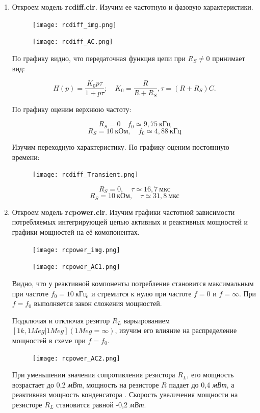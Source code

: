 \documentclass[a4paper, 12pt]{article}%
\begin{document}
\begin{enumerate}
\item Откроем модель \textbf{rcdiff.cir}. Изучим ее частотную и фазовую характеристики.

\begin{figure}[h!]
\centering
\texttt{[image: rcdiff\_img.png]}
\label{fig:Image1}
\end{figure}

\begin{figure}[h!]
\centering
\texttt{[image: rcdiff\_AC.png]}
\label{fig:Image1}
\end{figure}

По графику видно, что передаточная функция цепи при $R_S \neq 0$ принимает вид:

\[H(p) = \frac{K_0p\tau}{1 + p\tau}; \quad K_0 = \frac{R}{R + R_S},\tau = (R + R_S) C.\]

По графику оценим верхнюю частоту:

\[R_S = 0 \quad f_0 \simeq 9,75 \: \textit{кГц}\]
\[R_S = 10 \: \textit{кОм}, \quad f_0 \simeq 4,88 \: \textit{кГц}\]

Изучим переходную характеристику. По графику оценим постоянную времени:

\begin{figure}[h!]
\centering
\texttt{[image: rcdiff\_Transient.png]}
\label{fig:Image1}
\end{figure}

\[R_S = 0, \quad \tau \simeq 16,7 \: \textit{мкс}\]
\[R_S = 10 \: \textit{кОм}, \quad \tau \simeq 31,8 \: \textit{мкс}\]

\item Откроем модель \textbf{rcpower.cir}. Изучим графики частотной зависимости потребляемых интегрирующей цепью активных и реактивных мощностей и графики мощностей на её комопонентах.

\begin{figure}[h!]
\centering
\texttt{[image: rcpower\_img.png]}
\label{fig:Image1}
\end{figure}

\begin{figure}[h!]
\centering
\texttt{[image: rcpower\_AC1.png]}
\label{fig:Image1}
\end{figure}

Видно, что у реактивной компоненты потребление становится максимальным при частоте $f_0 = 10 \: \textit{кГц}$, и стремится к нулю при частоте $f = 0$ и $f = \infty$. При $f = f_0$ выполняется закон сложения мощностей.

Подключая и отключая резитор $R_L$ варьированием $[1k, 1Meg \vert 1Meg] (1Meg = \infty)$, изучим его влияние на распределение мощностей в схеме при $f = f_0$.

\begin{figure}[h!]
\centering
\texttt{[image: rcpower\_AC2.png]}
\label{fig:Image1}
\end{figure}

При уменьшении значения сопротивления резистора $R_L$, его мощность возрастает до 0,2 \textit{мВт}, мощность на резисторе $R$ падает до 0,4 \textit{мВт}, а реактивная мощность конденсатора . Скорость увеличения мощности на резисторе $R_L$ становится равной -0,2 \textit{мВт}.

\end{enumerate}
\end{document}
